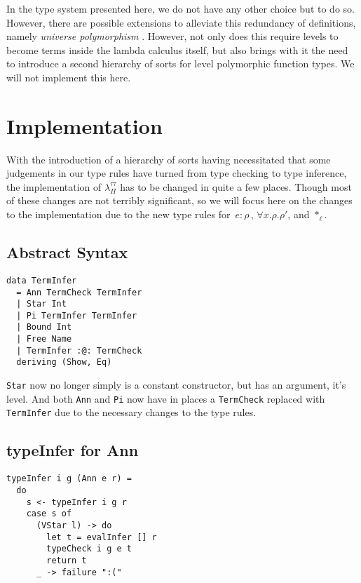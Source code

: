 \documentclass[runningheads]{llncs}
\begin{document}
In the type system presented here, we do not have any other choice but to do so.
However, there are possible extensions to alleviate this redundancy of
definitions, namely \textit{universe polymorphism} \cite{sozeau2014universe}.
However, not only does this require levels to become terms inside the lambda
calculus itself, but also brings with it the need to introduce a second
hierarchy of sorts for level polymorphic function types. We will not implement
this here.

\section{Implementation}

With the introduction of a hierarchy of sorts having necessitated that some
judgements in our type rules have turned from type checking to type inference,
the implementation of $\lambda_\Pi^{\tau \tau}$ has to be changed in quite a few
places. Though most of these changes are not terribly significant, so we will focus
here on the changes to the implementation due to the new type rules for $\,e :
\rho\,$, $\forall x . \rho . \rho'$, and $\ast_\ell$.

\subsection{Abstract Syntax}

\begin{lstlisting}
data TermInfer
  = Ann TermCheck TermInfer
  | Star Int
  | Pi TermInfer TermInfer
  | Bound Int
  | Free Name
  | TermInfer :@: TermCheck
  deriving (Show, Eq)
\end{lstlisting}

\lstinline{Star} now no longer simply is a constant constructor, but has an
argument, it's level. And both \lstinline{Ann} and \lstinline{Pi} now have in
places a \lstinline{TermCheck} replaced with \lstinline{TermInfer} due to the
necessary changes to the type rules.

\subsection{typeInfer for Ann}

\begin{lstlisting}
typeInfer i g (Ann e r) =
  do
    s <- typeInfer i g r
    case s of
      (VStar l) -> do
        let t = evalInfer [] r
        typeCheck i g e t
        return t
      _ -> failure ":("
\end{lstlisting}
\end{document}
